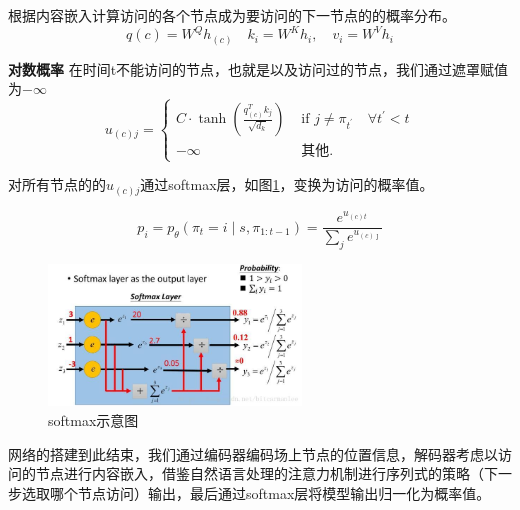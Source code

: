 \documentclass{whutmod}
\begin{document}
根据内容嵌入计算访问的各个节点成为要访问的下一节点的的概率分布。
\begin{equation}
	q (c)=W^{Q} h _{(c)} \quad k _{i}=W^{K} h _{i}, \quad v _{i}=W^{V} h _{i}
\end{equation}

\textbf{对数概率}\quad
在时间t不能访问的节点，也就是以及访问过的节点，我们通过遮罩赋值为$-\infty$
\begin{equation}
	u_{(c) j}=\left\{\begin{array}{ll}
		C \cdot \tanh \left(\frac{ q _{(c)}^{T} k _{j}}{\sqrt{d_{k}}}\right) & \text { if } j \neq \pi_{t^{\prime}} \quad \forall t^{\prime}<t \\
		-\infty & \text { 其他. }
		\end{array}\right.
\end{equation}

对所有节点的的$u_{(c) j}$通过softmax层，如图\ref{fig:softmax}，变换为访问的概率值。

\begin{equation}
	p_{i}=p_{ \theta }\left(\pi_{t}=i \mid s, \pi_{1: t-1}\right)=\frac{e^{u_{(c) t}}}{\sum_{j} e^{u_{(c) \jmath}}}
\end{equation}
\begin{figure}[!h]
	\centering
	\includegraphics[width=0.6\textwidth]{softmax.jpg}
	\caption{softmax示意图}
	\label{fig:softmax}
\end{figure}
网络的搭建到此结束，我们通过编码器编码场上节点的位置信息，解码器考虑以访问的节点进行内容嵌入，借鉴自然语言处理的注意力机制进行序列式的策略（下一步选取哪个节点访问）输出，最后通过softmax层将模型输出归一化为概率值。
\end{document}
